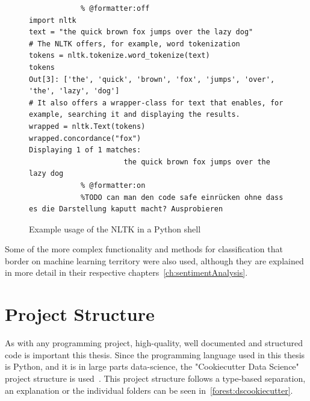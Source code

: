 \begin{figure}
    \caption{Example usage of the NLTK in a Python shell}
    \label{code:nltk}
        \begin{verbatim}
            % @formatter:off
import nltk
text = "the quick brown fox jumps over the lazy dog"
# The NLTK offers, for example, word tokenization
tokens = nltk.tokenize.word_tokenize(text)
tokens
Out[3]: ['the', 'quick', 'brown', 'fox', 'jumps', 'over', 'the', 'lazy', 'dog']
# It also offers a wrapper-class for text that enables, for example, searching it and displaying the results.
wrapped = nltk.Text(tokens)
wrapped.concordance("fox")
Displaying 1 of 1 matches:
                      the quick brown fox jumps over the lazy dog
            % @formatter:on
            %TODO can man den code safe einrücken ohne dass es die Darstellung kaputt macht? Ausprobieren
        \end{verbatim}
\end{figure}

Some of the more complex functionality and methods for classification that border on machine learning territory were also used,
although they are explained in more detail in their respective chapters~\ref{ch:sentimentAnalysis}.

\section{Project Structure}
\label{sec:projectStructure}

As with any programming project, high-quality, well documented and structured code is important this thesis.
Since the programming language used in this thesis is Python, and it is in large parts data-science,
the "Cookiecutter Data Science" %
project structure is used~\cite{dsCookieCutter}.
This project structure follows a type-based separation, an explanation or the individual folders can be seen in~\ref{forest:dscookiecutter}.

